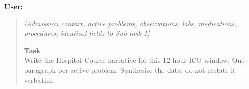 \documentclass[sigconf,anonymous=false,review=false]{acmart}
\begin{document}
\textbf{User:}
\begin{quote}
\small
\textit{[Admission context, active problems, observations, labs,
medications, procedures; identical fields to Sub-task 1]}

\medskip
\textbf{Task}\\
Write the Hospital Course narrative for this 12-hour ICU window.
One paragraph per active problem.
Synthesise the data; do not restate it verbatim.
\end{quote}
\end{document}
